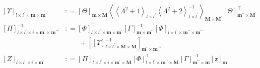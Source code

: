 \documentclass[preprint,12pt]{elsarticle}
\newcommand*{\M}[1]{\ensuremath{#1}\xspace}
\newcommand*{\x}{\times}
\newcommand*{\mi}[1]{\mathbf{#1}}
\newcommand*{\rv}[1]{\mathsf{#1}}
\newcommand*{\te}[2][]{\left\lbrack{#2}\right\rbrack_{#1}}
\newcommand*{\diag}[2][]{\left\langle{#2}\right\rangle_{#1}}
\newcommand*{\deq}{\M{\mathrel{\mathop:}=}}
\begin{document}
        \begin{equation*}
            \begin{aligned}
                \te[l\x l^{\prime}\x\mi{m}\x\mi{m^{\prime\prime}}]{\Upsilon} &\deq \te[\mi{m}\x\mi{M}]{\Theta}
                \diag[\mi{M}\x\mi{M^{\prime}}]{\diag[l\x l^{\prime}]{\Lambda^{2}+1}\diag[l\x l^{\prime}]{\Lambda^{2}+2}^{-1}} \te[\mi{m^{\prime\prime}}\x\mi{M^{\prime}}]{\Theta}^{\intercal} \\
                \te[l\x l^{\prime}\x i\x\mi{m^{\prime}}\x\mi{m^{\prime\prime\prime}}]{\Pi}^{-1} &\deq \te[l\x l^{\prime}\x\mi{m}\x\mi{m^{\prime}}]{\Phi}^{\intercal}
                \te[\mi{m}\x\mi{m^{\prime\prime}}]{\Gamma}^{-1} \te[l\x l^{\prime}\x\mi{m^{\prime\prime}}\x\mi{m^{\prime\prime\prime}}]{\Phi} \\
                &\phantom{\deq}\ +\te[\mi{m^{\prime}}\x\mi{m^{\prime\prime\prime}}]{\te[l\x l^{\prime}\x\mi{M}\x\mi{M}]{\Upsilon}^{-1}} \\
                \te[l\x l^{\prime}\x i\x\mi{m^{\prime}}]{Z} &\deq 
                \te[l\x l^{\prime}\x i\x\mi{m^{\prime}}\x\mi{M}]{\Pi}
                \te[l\x l^{\prime}\x\mi{m^{\prime\prime}}\x\mi{M}]{\Phi}^{\intercal}
                \te[\mi{m^{\prime\prime}}\x\mi{m}]{\Gamma}^{-1}
                \te[\mi{m}]{\rv{z}}
            \end{aligned}
        \end{equation*}
\end{document}
